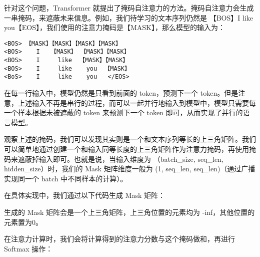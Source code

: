 \documentclass[12pt,a4paper]{book}
\begin{document}
针对这个问题，Transformer
就提出了掩码自注意力的方法。掩码自注意力会生成一串掩码，来遮蔽未来信息。例如，我们待学习的文本序列仍然是
【BOS】I like
you【EOS】，我们使用的注意力掩码是【MASK】，那么模型的输入为：

\begin{verbatim}
<BOS> 【MASK】【MASK】【MASK】【MASK】
<BOS>    I   【MASK】 【MASK】【MASK】
<BOS>    I     like  【MASK】【MASK】
<BOS>    I     like    you  【MASK】
<BoS>    I     like    you   </EOS>
\end{verbatim}

在每一行输入中，模型仍然是只看到前面的 token，预测下一个
token。但是注意，上述输入不再是串行的过程，而可以一起并行地输入到模型中，模型只需要每一个样本根据未被遮蔽的
token 来预测下一个 token 即可，从而实现了并行的语言模型。

观察上述的掩码，我们可以发现其实则是一个和文本序列等长的上三角矩阵。我们可以简单地通过创建一个和输入同等长度的上三角矩阵作为注意力掩码，再使用掩码来遮蔽掉输入即可。也就是说，当输入维度为
（batch\_size, seq\_len, hidden\_size）时，我们的 Mask 矩阵维度一般为
(1, seq\_len, seq\_len)（通过广播实现同一个 batch 中不同样本的计算）。

在具体实现中，我们通过以下代码生成 Mask 矩阵：

\begin{Shaded}
\begin{Highlighting}[]
\OperatorTok{=}\NormalTok{(}\NormalTok{))}
\OperatorTok{=}\OperatorTok{=}\NormalTok{)}
\end{Highlighting}
\end{Shaded}

生成的 Mask 矩阵会是一个上三角矩阵，上三角位置的元素均为
-inf，其他位置的元素置为0。

在注意力计算时，我们会将计算得到的注意力分数与这个掩码做和，再进行
Softmax 操作：

\begin{Shaded}
\begin{Highlighting}[]
\OperatorTok{=}\OperatorTok{+}
\OperatorTok{=}\OperatorTok{={-}}
\end{Highlighting}
\end{Shaded}
\end{document}
